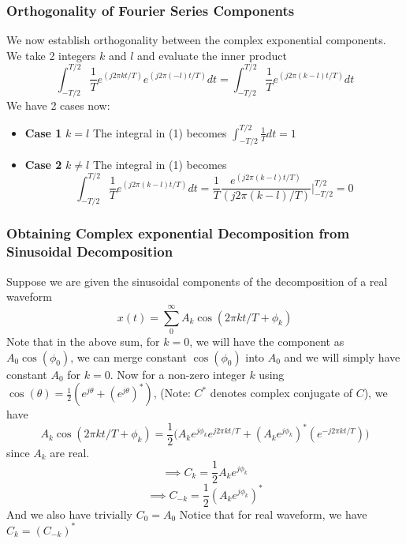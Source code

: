 \subsubsection{Orthogonality of Fourier Series Components}
We now establish orthogonality between the complex exponential components.
We take 2 integers $k$ and $l$ and evaluate the inner product
\begin{equation}
\int_{-T/2}^{T/2}{\frac{1}{T}e^{(j2\pi kt/T)}e^{(j2\pi (-l)t/T)}}dt = \int_{-T/2}^{T/2}{\frac{1}{T}e^{(j2\pi (k-l)t/T)}}dt
\end{equation}
We have 2 cases now:
\begin{itemize}
\item {\textbf{Case 1}} $k=l$ The integral in (1) becomes $\int_{-T/2}^{T/2}\frac{1}{T}dt = 1$
\item {\textbf{Case 2}} $k \neq l$ The integral in (1) becomes $$\int_{-T/2}^{T/2}{\frac{1}{T}e^{(j2\pi (k-l)t/T)}}dt = \frac{1}{T}\frac{e^{(j2\pi (k-l)t/T)}}{(j2\pi (k-l)/T)}\Bigg|_{-T/2}^{T/2} = 0$$
\end{itemize}
\subsubsection{Obtaining Complex exponential Decomposition from Sinusoidal Decomposition}
Suppose we are given the sinusoidal components of the decomposition of a real waveform $$x(t) = \sum_{0}^{\infty}A_{k}\cos(2\pi kt/T + \phi_{k})$$
Note that in the above sum, for $k = 0$, we will have the component as $A_{0}\cos(\phi_{0})$, we can merge constant $\cos(\phi_{0})$ into $A_{0}$ and we will simply have constant $A_{0}$ for $k = 0$.
Now for a non-zero integer $k$ using $\cos(\theta) = \frac{1}{2}(e^{j\theta} + (e^{j\theta})^{*})$, (Note: $C^{*}$ denotes complex conjugate of $C$), we have $$A_{k}\cos(2\pi kt/T + \phi_{k}) = \frac{1}{2}\Bigg(A_{k}e^{j\phi_{k}}e^{j2\pi kt/T} + (A_{k}e^{j\phi_{k}})^{*} (e^{-j2\pi kt/T})\Bigg)$$
since $A_k$ are real.
$$\implies C_{k} = \frac{1}{2}A_{k}e^{j\phi_{k}}$$
$$\implies C_{-k} = \frac{1}{2}(A_{k}e^{j\phi_{k}})^{*}$$
And we also have trivially $C_{0} = A_{0}$
Notice that for real waveform, we have $C_{k} = (C_{-k})^{*}$


